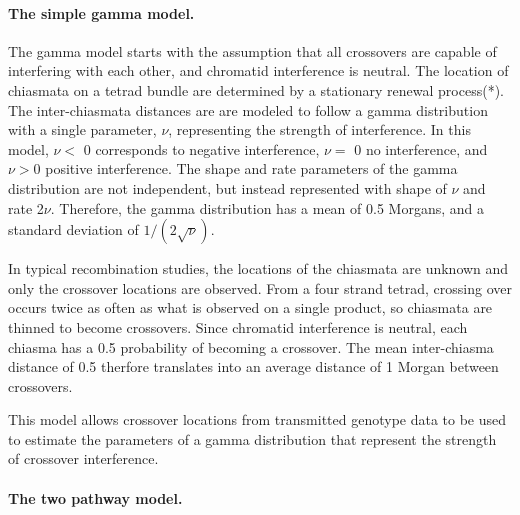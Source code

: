 


\paragraph{The simple gamma model.} \label{cointTPM}

The gamma model starts with the assumption that all crossovers are capable of interfering with each other, and chromatid interference is neutral.
The location of chiasmata on a tetrad bundle are determined by a stationary renewal process(*).
The inter-chiasmata distances are are modeled to follow a gamma distribution with a single parameter, $\nu$, representing the strength of interference.
In this model, $\nu <$ 0 corresponds to negative interference, $\nu=$ 0 no interference, and $\nu>$0 positive interference.
The shape and rate parameters of the gamma distribution are not independent, but instead represented with shape of $\nu$ and rate 2$\nu$.
Therefore, the gamma distribution has a mean of 0.5 Morgans, and a standard deviation of $1 / ( 2 \sqrt{\nu} )$.


In typical recombination studies, the locations of the chiasmata are unknown and only the crossover locations are observed.
From a four strand tetrad, crossing over occurs twice as often as what is observed on a single product, so chiasmata are thinned to become crossovers.
Since chromatid interference is neutral, each chiasma has a 0.5 probability of becoming a crossover.
The mean inter-chiasma distance of 0.5 therfore translates into an average distance of 1 Morgan between crossovers.

This model allows crossover locations from transmitted genotype data to be used to estimate the parameters of a gamma distribution that represent the strength of crossover interference.




\paragraph{The two pathway model.}

